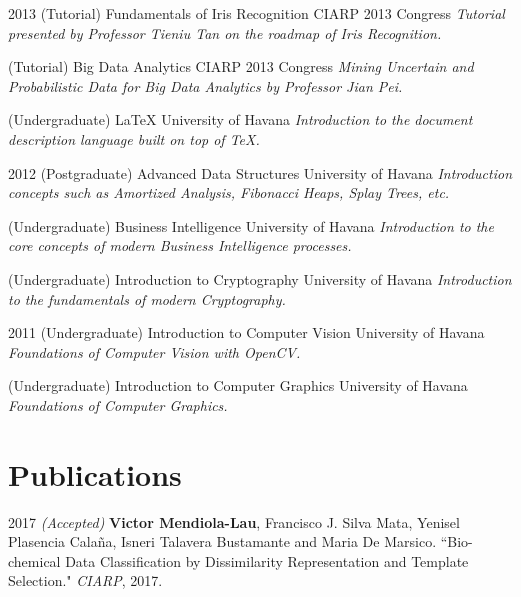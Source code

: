 \documentclass[]{friggeri-cv}
\begin{document}
\begin{entrylist}    
  \entry
    {2013}
    {(Tutorial) Fundamentals of Iris Recognition}
    {CIARP 2013 Congress}
    {\emph{Tutorial presented by Professor Tieniu Tan on the roadmap of Iris Recognition.}}

  \entry
    {}
    {(Tutorial) Big Data Analytics}
    {CIARP 2013 Congress}
    {\emph{Mining Uncertain and Probabilistic Data for Big Data Analytics by Professor Jian Pei.}}
    
  \entry
    {}
    {(Undergraduate) \LaTeX}
    {University of Havana}
    {\emph{Introduction to the document description language built on top of \TeX.}}
\end{entrylist}
       
\begin{entrylist}
  \entry
    {2012}
    {(Postgraduate) Advanced Data Structures}
    {University of Havana}
    {\emph{Introduction concepts such as Amortized Analysis, Fibonacci Heaps, Splay Trees, etc.}}      

  \entry
    {}
    {(Undergraduate) Business Intelligence}
    {University of Havana}
    {\emph{Introduction to the core concepts of modern Business Intelligence processes.}}

  \entry
    {}
    {(Undergraduate) Introduction to Cryptography}
    {University of Havana}
    {\emph{Introduction to the fundamentals of modern Cryptography.}}
\end{entrylist}

\begin{entrylist}
  \entry
    {2011}
    {(Undergraduate) Introduction to Computer Vision}
    {University of Havana}
    {\emph{Foundations of Computer Vision with OpenCV.}}      

  \entry
    {}
    {(Undergraduate) Introduction to Computer Graphics}
    {University of Havana}
    {\emph{Foundations of Computer Graphics.}}
\end{entrylist}

\pagebreak

\section{Publications}
\begin{paperlist}
  \paperentry
    {2017}
    {}
    {}
    {
		\emph{(Accepted)} \textbf{Victor Mendiola-Lau}, Francisco J. Silva Mata, Yenisel Plasencia Calaña, Isneri Talavera Bustamante and Maria De Marsico. ``Bio-chemical Data Classification by Dissimilarity Representation and Template Selection." \emph{CIARP}, 2017.
    }
\end{paperlist}
\end{document}
